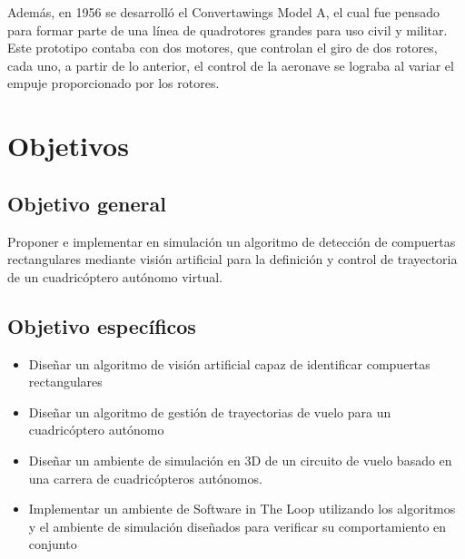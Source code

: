 Además, en 1956 se desarrolló el Convertawings Model A, el cual fue pensado para formar parte de una línea de quadrotores grandes para uso civil y militar. Este prototipo contaba con dos motores, que controlan el giro de dos rotores, cada uno, a partir de lo anterior, el control de la aeronave se lograba al variar el empuje proporcionado por los rotores.





\section{Objetivos}
\subsection{Objetivo general}

Proponer e implementar en simulación un algoritmo de detección de compuertas rectangulares mediante visión artificial para la definición y control de trayectoria de un cuadricóptero autónomo virtual.  


\subsection{Objetivo específicos}

\begin{itemize}
    \item Diseñar un algoritmo de visión artificial capaz de identificar compuertas rectangulares 
    \item Diseñar un algoritmo de gestión de trayectorias de vuelo para un cuadricóptero autónomo 
    \item Diseñar un ambiente de simulación en 3D de un circuito de vuelo basado en una carrera de cuadricópteros autónomos. 
    \item Implementar un ambiente de Software in The Loop utilizando los algoritmos y el ambiente de simulación diseñados para verificar su comportamiento en conjunto 
\end{itemize}

